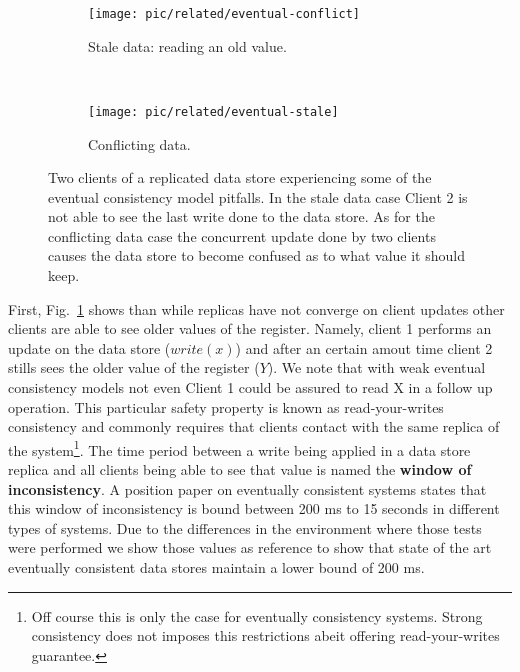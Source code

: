\begin{figure}
  \centering
  \begin{subfigure}[b]{0.5\textwidth}
                \centering
                \texttt{[image: pic/related/eventual-conflict]}
                \caption{Stale data: reading an old value.}
                \label{fig:related:eventual-stale}
        \end{subfigure}%
        ~
        \begin{subfigure}[b]{0.5\textwidth}
                \centering
                \texttt{[image: pic/related/eventual-stale]}
                \caption{Conflicting data.}
                \label{fig:related:eventual-conflict}
        \end{subfigure}
  \caption[Eventual Consistency pitfalls]{Two clients of a replicated data store experiencing some of the eventual consistency model pitfalls. In the stale data case Client 2 is not able to see the last write done to the data store. As for the conflicting data case the concurrent update done  by two clients causes the data store to become confused as to what value it should keep.}
\label{fig:related:eventual}
\end{figure}


First,  Fig.~\ref{fig:related:eventual-stale} shows than while replicas have not converge on client updates other clients are able to see older values of the register. 
Namely, client 1 performs an update on the data store ($write(x)$) and after an certain amout time client 2 stills sees the older value of the register ($Y$). 
We note that with weak eventual consistency models not even Client 1 could be assured to read X in a follow up operation. 
This particular safety property is known as read-your-writes consistency and commonly requires that clients contact with the same replica of the system\footnote{Off course this is only the case for eventually consistency systems. Strong consistency does not imposes this restrictions abeit offering read-your-writes guarantee.}. 
The time period between a write being applied in a data store replica and all clients being able to see that value is named the \textbf{window of inconsistency}.  A position paper on eventually consistent systems states that this window of inconsistency is bound between 200 ms to 15 seconds in different types of systems\cite{bailis2013eventual}. Due to the differences in the environment where those tests were performed we show those values as reference to show that state of the art eventually consistent data stores maintain a lower bound of 200 ms. 

